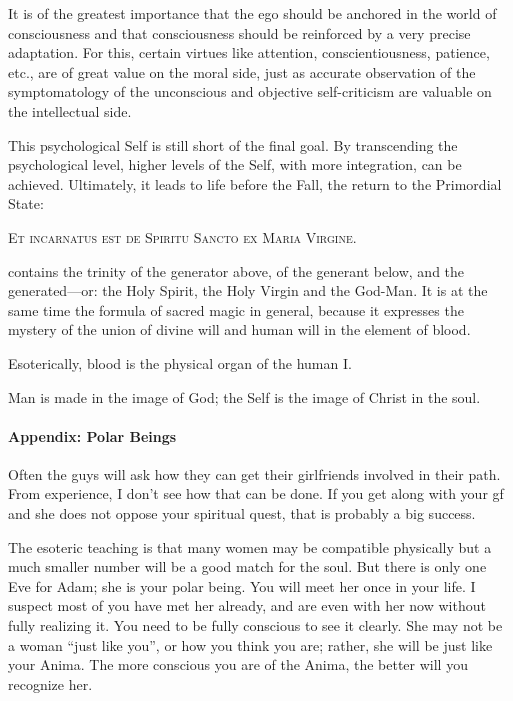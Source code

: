 \begin{quotex}
It is of the greatest importance that the ego should be anchored in the world of consciousness and that consciousness should be reinforced by a very precise adaptation. For this, certain virtues like attention, conscientiousness, patience, etc., are of great value on the moral side, just as accurate observation of the symptomatology of the unconscious and objective self-criticism are valuable on the intellectual side. 

\end{quotex}
This psychological Self is still short of the final goal. By transcending the psychological level, higher levels of the Self, with more integration, can be achieved. Ultimately, it leads to life before the Fall, the return to the Primordial State:

\textsc{Et incarnatus est de Spiritu Sancto ex Maria Virgine}.

\begin{quotex}
 contains the trinity of the generator above, of the generant below, and the generated—or: the Holy Spirit, the Holy Virgin and the God-Man. It is at the same time the formula of sacred magic in general, because it expresses the mystery of the union of divine will and human will in the element of blood. 

\end{quotex}
Esoterically, blood is the physical organ of the human I.

Man is made in the image of God; the Self is the image of Christ in the soul.

\paragraph{Appendix: Polar Beings}
Often the guys will ask how they can get their girlfriends involved in their path. From experience, I don't see how that can be done. If you get along with your gf and she does not oppose your spiritual quest, that is probably a big success.

The esoteric teaching is that many women may be compatible physically but a much smaller number will be a good match for the soul. But there is only one Eve for Adam; she is your polar being. You will meet her once in your life. I suspect most of you have met her already, and are even with her now without fully realizing it. You need to be fully conscious to see it clearly. She may not be a woman “just like you”, or how you think you are; rather, she will be just like your Anima. The more conscious you are of the Anima, the better will you recognize her.

